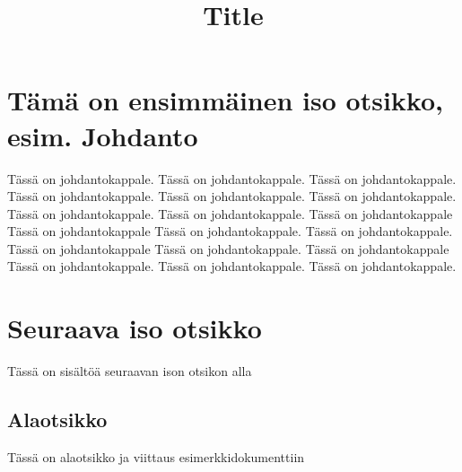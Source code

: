 \documentclass[a4paper]{article}
\begin{document}
\title{\large Title}

\section{Tämä on ensimmäinen iso otsikko, esim. Johdanto}

Tässä on johdantokappale. Tässä on johdantokappale. Tässä on johdantokappale. Tässä on johdantokappale. Tässä on johdantokappale. Tässä on johdantokappale. Tässä on johdantokappale. Tässä on johdantokappale. Tässä on johdantokappale Tässä on johdantokappale Tässä on johdantokappale. Tässä on johdantokappale. Tässä on johdantokappale Tässä on johdantokappale. Tässä on johdantokappale Tässä on johdantokappale. Tässä on johdantokappale. Tässä on johdantokappale.

\section{Seuraava iso otsikko}

Tässä on sisältöä seuraavan ison otsikon alla

\subsection{Alaotsikko}

Tässä on alaotsikko ja viittaus esimerkkidokumenttiin \citep{koski2012}




\end{document}
